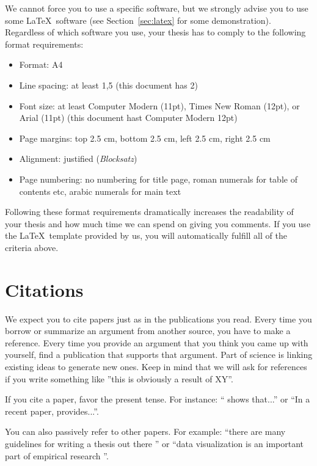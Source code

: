 \documentclass[a4paper, 12pt]{article}
\begin{document}
	We cannot force you to use a specific software, but we strongly advise you to use some \LaTeX\ software (see Section~\ref{sec:latex} for some demonstration). Regardless of which software you use, your thesis has to comply to the following format requirements:
	\begin{itemize}
		\item Format: A4
		\item Line spacing: at least 1,5 (this document has 2) 
		\item Font size: at least Computer Modern (11pt), Times New Roman (12pt), or Arial (11pt) (this document hast Computer Modern 12pt)
		\item Page margins: top 2.5 cm, bottom 2.5 cm, left 2.5 cm, right 2.5 cm
		\item Alignment: justified (\emph{Blocksatz})
		\item Page numbering: no numbering for title page, roman numerals for table of contents etc, arabic numerals for main text
	\end{itemize}	
	Following these format requirements dramatically increases the readability of your thesis and how much time we can spend on giving you comments. If you use the \LaTeX\ template provided by us, you will automatically fulfill all of the criteria above.
	
	\section{Citations}\label{sec:citations}
		
	We expect you to cite papers just as in the publications you read. Every time you borrow or summarize an argument from another source, you have to make a reference. Every time you provide an argument that you think you came up with yourself, find a publication that supports that argument. Part of science is linking existing ideas to generate new ones. Keep in mind that we will ask for references if you write something like ''this is obviously a result of XY''.
		
	If you cite a paper, favor the present tense. For instance: ``\cite{Cochrane.2005} shows that...'' or ``In a recent paper, \cite{Schwabish.2014} provides...''. 
		
	You can also passively refer to other papers. For example: ``there are many guidelines for writing a thesis out there \citep[see e.g.][]{Cochrane.2005}'' or ``data visualization is an important part of empirical research \citep{Schwabish.2014}''.
		
\end{document}
